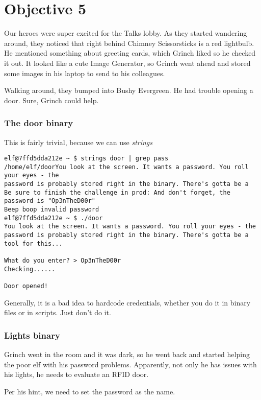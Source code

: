 \chapter{Objective 5}
Our heroes were super excited for the Talks lobby. As they started wandering around, they noticed that right behind {\color{codegreen}Chimney Scissorsticks} is a red lightbulb. He mentioned something about greeting cards, which
Grinch liked so he checked it out. It looked like a cute Image Generator, so Grinch went ahead and stored some images in his laptop to send to his colleagues.

Walking around, they bumped into {\color{codegreen}Bushy Evergreen}. He had trouble opening a door. Sure, Grinch could help.

\subsection{The door binary}
This is fairly trivial, because we can use \textit{strings}
\begin{verbatim}
elf@7ffd5dda212e ~ $ strings door | grep pass
/home/elf/doorYou look at the screen. It wants a password. You roll your eyes - the
password is probably stored right in the binary. There's gotta be a
Be sure to finish the challenge in prod: And don't forget, the password is "Op3nTheD00r"
Beep boop invalid password
elf@7ffd5dda212e ~ $ ./door
You look at the screen. It wants a password. You roll your eyes - the
password is probably stored right in the binary. There's gotta be a
tool for this...

What do you enter? > Op3nTheD00r
Checking......

Door opened!
\end{verbatim}

Generally, it is a bad idea to hardcode credentials, whether you do it in binary files or in scripts. Just don't do it.
\subsection {Lights binary}
Grinch went in the room and it was dark, so he went back and started helping the poor elf with his password problems.
Apparently, not only he has issues with his lights, he needs to evaluate an RFID door.

Per his hint, we need to set the password as the name.

